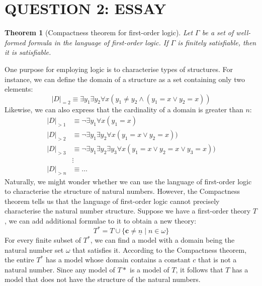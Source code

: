 \section*{QUESTION 2: ESSAY}
\newtheorem{theorem}{Theorem}

\begin{theorem}[Compactness theorem for first-order logic]
Let $\Gamma$ be a set of well-formed formula in the language of first-order logic. If $\Gamma$ is finitely satisfiable, then it is satisfiable.
\end{theorem}

One purpose for employing logic is to characterise types of structures. For instance, we can define the domain of a structure as a set containing only two elements:
\begin{equation*}
   |D|_{=2} \equiv \exists y_1 \exists y_2 \forall x (y_1 \neq y_2 \land (y_1 = x \lor y_2 = x))
\end{equation*}
Likewise, we can also express that the cardinality of a domain is greater than $n$:
\begin{align*}
   |D|_{>1} &\equiv \neg \exists y_1 \forall x (y_1 = x) \\
   |D|_{>2} &\equiv \neg \exists y_1 \exists y_2 \forall x (y_1 = x \lor y_2 = x)) \\
   |D|_{>3} &\equiv \neg \exists y_1 \exists y_2 \exists y_3 \forall x (y_1 = x \lor y_2 = x \lor y_3 = x)) \\
   &\vdots \\
   |D|_{>n} &\equiv \dots
\end{align*}
Naturally, we might wonder whether we can use the language of first-order logic to characterise the structure of natural numbers. However, the Compactness theorem tells us that the language of first-order logic cannot precisely characterise the natural number structure. Suppose we have a first-order theory $T$, we can add additional formulae to it to obtain a new theory:
\begin{equation*}
   T^* = T \cup \{ \mathbf{c} \neq \underline{n} \mid n \in \omega \}
\end{equation*}
For every finite subset of $T^*$, we can find a model with a domain being the natural number set $\omega$ that satisfies it. According to the Compactness theorem, the entire $T^*$ has a model whose domain contains a constant $c$ that is not a natural number. Since any model of $T*$ is a model of $T$, it follows that $T$ has a model that does not have the structure of the natural numbers.

